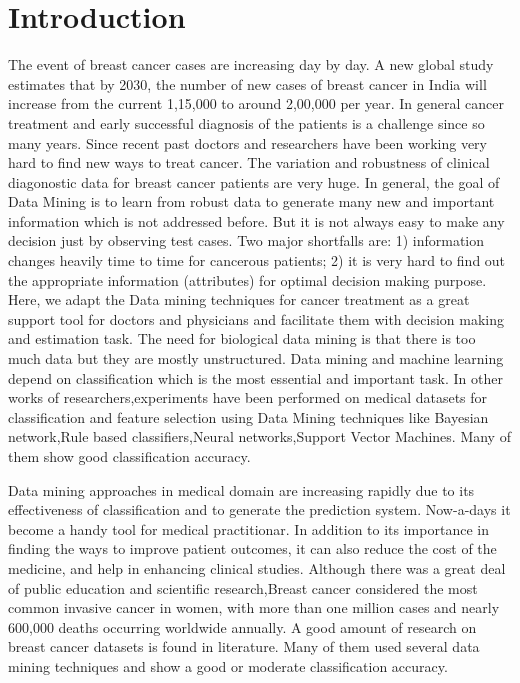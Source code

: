 \documentclass[conference]{IEEEtran}
\begin{document}
\section{Introduction}
The event of breast cancer cases are increasing day by day. A new global study estimates that by 2030, the number of new cases of breast cancer in India will increase from the current 1,15,000 to around 2,00,000 per year\cite{IEEEhowto:nci}. In general cancer treatment and early successful diagnosis of the patients is a challenge since so many years. Since recent past doctors and researchers have been working very hard to find new ways to treat cancer. The variation and robustness of clinical diagonostic data for breast cancer patients are very huge. In general, the goal of Data Mining is to learn from robust data to generate many new and important information which is not addressed before. But it is not always easy to make any decision just by observing  test cases. Two major shortfalls are: 1) information changes heavily time to time for cancerous patients; 2) it is very hard to find out the appropriate information (attributes) for optimal decision making purpose\cite{IEEEhowto:delen}. Here, we adapt the Data mining techniques for cancer treatment as a great support tool for doctors and physicians and facilitate them with decision making and estimation task. The need for biological data mining is that there is too much data but they are mostly unstructured. Data mining and machine learning depend on classification which is the most essential and important task. In other works of researchers,experiments have been performed on medical datasets for classification and feature selection using Data Mining techniques like Bayesian network,Rule based classifiers,Neural networks,Support Vector Machines. Many of them show good classification accuracy.

Data mining approaches in medical domain are increasing rapidly due to its effectiveness of classification and to generate the prediction system. Now-a-days it become a handy tool for medical practitionar. In addition to its importance in finding the ways to improve patient outcomes, it can also reduce the cost of the medicine, and help in enhancing clinical studies. Although there was a great deal of public education and scientific research,Breast cancer considered the most common invasive cancer in women, with more than one million cases and nearly 600,000 deaths occurring worldwide annually\cite{IEEEhowto:nci}.  A good amount of research on breast cancer datasets is found in literature\cite{IEEEhowto:elsayad, IEEEhowto:shajahaan, IEEEhowto:samar, IEEEhowto:chaurasia}. Many of them used several data mining techniques and show a good or moderate classification accuracy.
\end{document}

